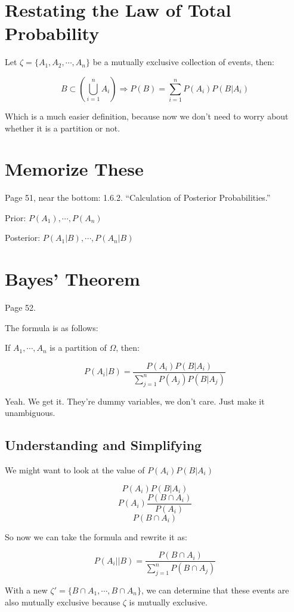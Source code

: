 \documentclass{article}
\begin{document}
\section*{Restating the Law of Total Probability}

Let $\zeta=\{A_1,A_2,\cdots,A_n\}$ be a mutually exclusive collection
of events, then:

\[
B\subset\left(\bigcup\limits_{i=1}^nA_i\right)\Rightarrow P(B)=\sum\limits_{i=1}^nP(A_i)P(B|A_i)
\]

Which is a much easier definition, because now we don't need to worry
about whether it is a partition or not.

\section*{Memorize These}

Page 51, near the bottom: 1.6.2. ``Calculation of Posterior
Probabilities.''

Prior: $P(A_1),\cdots,P(A_n)$

Posterior: $P(A_1|B),\cdots,P(A_n|B)$

\section*{Bayes' Theorem}

Page 52.

The formula is as follows:

If $A_1,\cdots,A_n$ is a partition of $\Omega$, then:

\[
P(A_i|B)=\dfrac{P(A_i)P(B|A_i)}{\sum\limits_{j=1}^nP(A_j)P(B|A_j)}
\]

Yeah. We get it. They're dummy variables, we don't care. Just make it
unambiguous.

\subsection*{Understanding and Simplifying}

We might want to look at the value of $P(A_i)P(B|A_i)$

\[
P(A_i)P(B|A_i)
\] \[
P(A_i)\dfrac{P(B\cap A_i)}{P(A_i)}
\] \[
P(B\cap A_i)
\]

So now we can take the formula and rewrite it as:

\[
P(A_i||B)=\dfrac{P(B\cap A_i)}{\sum\limits_{j=1}^nP(B\cap A_j)}
\]

With a new $\zeta'=\{B\cap{}A_1,\cdots,B\cap{}A_n\}$, we can determine
that these events are also mutually exclusive because $\zeta$ is
mutually exclusive.
\end{document}
